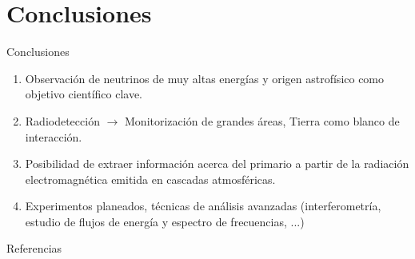 \documentclass{beamer}
\begin{document}
	\section{Conclusiones}
	\begin{frame}{Conclusiones}
\begin{enumerate}
	\item Observación de neutrinos de muy altas energías y origen astrofísico como objetivo científico clave. 
	\item Radiodetección $\rightarrow$ Monitorización de grandes áreas, Tierra como blanco de interacción.
	\item Posibilidad de extraer información acerca del primario a partir de la radiación electromagnética emitida en cascadas atmosféricas.
	\item Experimentos planeados, técnicas de análisis avanzadas (interferometría, estudio de flujos de energía y espectro de frecuencias, ...)
\end{enumerate}
	\end{frame}
	
	\begin{frame}{Referencias}
		\fontsize{9pt}{1}
		\nocite{*}
		
		
	\end{frame}
\end{document}
